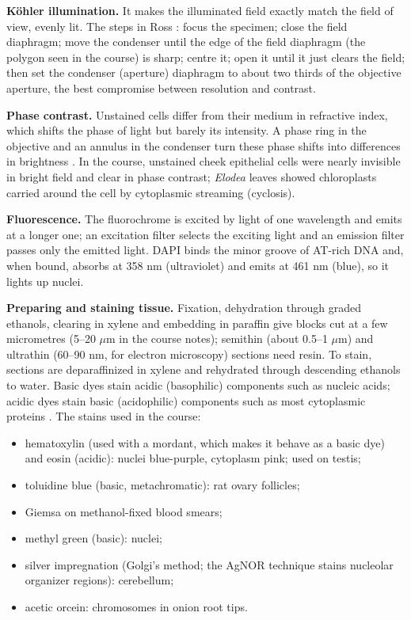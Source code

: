 \textbf{Köhler illumination.}
It makes the illuminated field exactly match
the field of view, evenly lit. The steps in
Ross \cite[Chapter 1]{ross2011histology}:
focus the specimen; close the field
diaphragm; move the condenser until the edge
of the field diaphragm (the polygon seen in
the course) is sharp; centre it; open it
until it just clears the field; then set the
condenser (aperture) diaphragm to about two
thirds of the objective aperture, the best
compromise between resolution and contrast.

\textbf{Phase contrast.}
Unstained cells differ from their medium in
refractive index, which shifts the phase of
light but barely its intensity. A phase ring
in the objective and an annulus in the
condenser turn these phase shifts into
differences in brightness \cite[Chapter
1]{ross2011histology}. In the course,
unstained cheek epithelial cells were nearly
invisible in bright field and clear in phase
contrast; \emph{Elodea} leaves showed
chloroplasts carried around the cell by
cytoplasmic streaming (cyclosis).

\textbf{Fluorescence.}
The fluorochrome is excited by light of one
wavelength and emits at a longer one; an
excitation filter selects the exciting light
and an emission filter passes only the
emitted light. DAPI binds the minor groove of
AT-rich DNA and, when bound, absorbs at 358
nm (ultraviolet) and emits at 461 nm (blue),
so it lights up nuclei.

\textbf{Preparing and staining tissue.}
Fixation, dehydration through graded
ethanols, clearing in xylene and embedding in
paraffin give blocks cut at a few micrometres
(5--20 $\mu$m in the course notes); semithin
(about 0.5--1 $\mu$m) and ultrathin (60--90
nm, for electron microscopy) sections need
resin. To stain, sections are deparaffinized
in xylene and rehydrated through descending
ethanols to water. Basic dyes stain acidic
(basophilic) components such as nucleic
acids; acidic dyes stain basic (acidophilic)
components such as most cytoplasmic proteins
\cite[Chapter 1]{ross2011histology}. The
stains used in the course:
\begin{itemize}
\item hematoxylin (used with a mordant, which
makes it behave as a basic dye) and eosin
(acidic): nuclei blue-purple, cytoplasm pink;
used on testis;
\item toluidine blue (basic, metachromatic):
rat ovary follicles;
\item Giemsa on methanol-fixed blood smears;
\item methyl green (basic): nuclei;
\item silver impregnation (Golgi's method;
the AgNOR technique stains nucleolar
organizer regions): cerebellum;
\item acetic orcein: chromosomes in onion
root tips.
\end{itemize}

